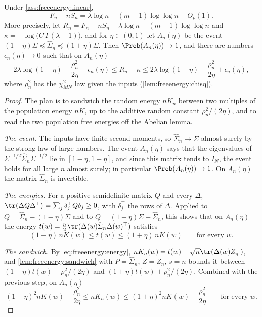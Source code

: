 \begin{refsection}
\begin{theorem}\label{thm:freeenergy:linear}
Under \cref{ass:freeenergy:linear},
\[
F_n-nS_n=\lambda\log n-(m-1)\log\log n+O_p(1).
\]
More precisely, let $R_n=F_n-nS_n-\lambda\log n+(m-1)\log\log n$ and $\kappa=-\log\bigl(C\,\Gamma(\lambda+1)\bigr)$, and for $\eta\in(0,1)$ let $A_n(\eta)$ be the event $(1-\eta)\Sigma\preceq\hat\Sigma_n\preceq(1+\eta)\Sigma$. Then $\Prob(A_n(\eta))\to1$, and there are numbers $\epsilon_n(\eta)\to0$ such that on $A_n(\eta)$
\begin{equation}\label{eq:freeenergy:band}
2\lambda\log(1-\eta)-\frac{\rho_n^2}{2\eta}-\epsilon_n(\eta)\le R_n-\kappa\le2\lambda\log(1+\eta)+\frac{\rho_n^2}{2\eta}+\epsilon_n(\eta),
\end{equation}
where $\rho_n^2$ has the $\chi^2_{MN}$ law given the inputs (\cref{lem:freeenergy:chisq}).
\end{theorem}

\begin{proof}
The plan is to sandwich the random energy $nK_n$ between two multiples of the population energy $nK$, up to the additive random constant $\rho_n^2/(2\eta)$, and to read the two population free energies off the Abelian lemma.

\emph{The event.} The inputs have finite second moments, so $\hat\Sigma_n\to\Sigma$ almost surely by the strong law of large numbers. The event $A_n(\eta)$ says that the eigenvalues of $\Sigma^{-1/2}\hat\Sigma_n\Sigma^{-1/2}$ lie in $[1-\eta,1+\eta]$, and since this matrix tends to $I_N$, the event holds for all large $n$ almost surely; in particular $\Prob(A_n(\eta))\to1$. On $A_n(\eta)$ the matrix $\hat\Sigma_n$ is invertible.

\emph{The energies.} For a positive semidefinite matrix $Q$ and every $\Delta$, $\tr(\Delta Q\Delta^\top)=\sum_j\delta_j^\top Q\delta_j\ge0$, with $\delta_j^\top$ the rows of $\Delta$. Applied to $Q=\hat\Sigma_n-(1-\eta)\Sigma$ and to $Q=(1+\eta)\Sigma-\hat\Sigma_n$, this shows that on $A_n(\eta)$ the energy $t(w)=\frac n2\tr(\Delta(w)\hat\Sigma_n\Delta(w)^\top)$ satisfies
\[
(1-\eta)\,nK(w)\le t(w)\le(1+\eta)\,nK(w)\qquad\text{for every }w .
\]

\emph{The sandwich.} By \eqref{eq:freeenergy:energy}, $nK_n(w)=t(w)-\sqrt n\tr(\Delta(w)Z_n^\top)$, and \cref{lem:freeenergy:sandwich} with $P=\hat\Sigma_n$, $Z=Z_n$, $s=n$ bounds it between $(1-\eta)t(w)-\rho_n^2/(2\eta)$ and $(1+\eta)t(w)+\rho_n^2/(2\eta)$. Combined with the previous step, on $A_n(\eta)$
\[
(1-\eta)^2nK(w)-\frac{\rho_n^2}{2\eta}\le nK_n(w)\le(1+\eta)^2nK(w)+\frac{\rho_n^2}{2\eta}\qquad\text{for every }w .
\]


\end{proof}
\end{refsection}
